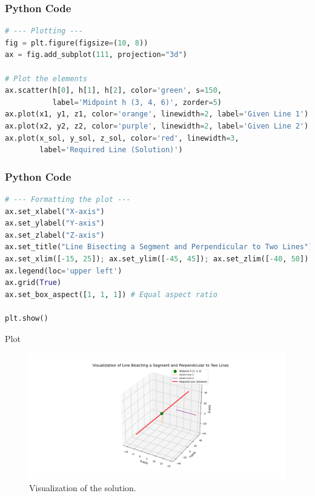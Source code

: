 \documentclass{beamer}
\begin{document}
\begin{frame}[fragile]
  \frametitle{Python Code}
  \begin{lstlisting}[language=Python]
# --- Plotting ---
fig = plt.figure(figsize=(10, 8))
ax = fig.add_subplot(111, projection="3d")

# Plot the elements
ax.scatter(h[0], h[1], h[2], color='green', s=150, 
           label='Midpoint h (3, 4, 6)', zorder=5)
ax.plot(x1, y1, z1, color='orange', linewidth=2, label='Given Line 1')
ax.plot(x2, y2, z2, color='purple', linewidth=2, label='Given Line 2')
ax.plot(x_sol, y_sol, z_sol, color='red', linewidth=3, 
        label='Required Line (Solution)')
  \end{lstlisting}
\end{frame}
\begin{frame}[fragile]
  \frametitle{Python Code}
  \begin{lstlisting}[language=Python]
# --- Formatting the plot ---
ax.set_xlabel("X-axis")
ax.set_ylabel("Y-axis")
ax.set_zlabel("Z-axis")
ax.set_title("Line Bisecting a Segment and Perpendicular to Two Lines")
ax.set_xlim([-15, 25]); ax.set_ylim([-45, 45]); ax.set_zlim([-40, 50])
ax.legend(loc='upper left')
ax.grid(True)
ax.set_box_aspect([1, 1, 1]) # Equal aspect ratio

plt.show()
  \end{lstlisting}
\end{frame}

\begin{frame}{Plot}
  \begin{figure}
    \centering
    \includegraphics[width=\textwidth]{../figs/figure_py.png}
    \caption{Visualization of the solution.}
    \label{fig:final_plot}
  \end{figure}
\end{frame}
\end{document}
